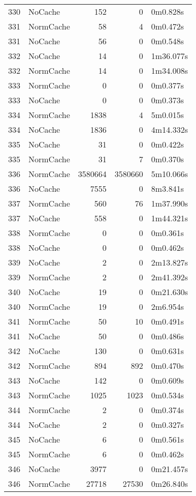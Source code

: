 \begin{tabular}{llrrl}
330 & NoCache & 152 & 0 & 0m0.828s \\
331 & NormCache & 58 & 4 & 0m0.472s \\
331 & NoCache & 56 & 0 & 0m0.548s \\
332 & NoCache & 14 & 0 & 1m36.077s \\
332 & NormCache & 14 & 0 & 1m34.008s \\
333 & NormCache & 0 & 0 & 0m0.377s \\
333 & NoCache & 0 & 0 & 0m0.373s \\
334 & NormCache & 1838 & 4 & 5m0.015s \\
334 & NoCache & 1836 & 0 & 4m14.332s \\
335 & NoCache & 31 & 0 & 0m0.422s \\
335 & NormCache & 31 & 7 & 0m0.370s \\
336 & NormCache & 3580664 & 3580660 & 5m10.066s \\
336 & NoCache & 7555 & 0 & 8m3.841s \\
337 & NormCache & 560 & 76 & 1m37.990s \\
337 & NoCache & 558 & 0 & 1m44.321s \\
338 & NormCache & 0 & 0 & 0m0.361s \\
338 & NoCache & 0 & 0 & 0m0.462s \\
339 & NoCache & 2 & 0 & 2m13.827s \\
339 & NormCache & 2 & 0 & 2m41.392s \\
340 & NoCache & 19 & 0 & 0m21.630s \\
340 & NormCache & 19 & 0 & 2m6.954s \\
341 & NormCache & 50 & 10 & 0m0.491s \\
341 & NoCache & 50 & 0 & 0m0.486s \\
342 & NoCache & 130 & 0 & 0m0.631s \\
342 & NormCache & 894 & 892 & 0m0.470s \\
343 & NoCache & 142 & 0 & 0m0.609s \\
343 & NormCache & 1025 & 1023 & 0m0.534s \\
344 & NormCache & 2 & 0 & 0m0.374s \\
344 & NoCache & 2 & 0 & 0m0.327s \\
345 & NoCache & 6 & 0 & 0m0.561s \\
345 & NormCache & 6 & 0 & 0m0.462s \\
346 & NoCache & 3977 & 0 & 0m21.457s \\
346 & NormCache & 27718 & 27530 & 0m26.840s \\

\end{tabular}
